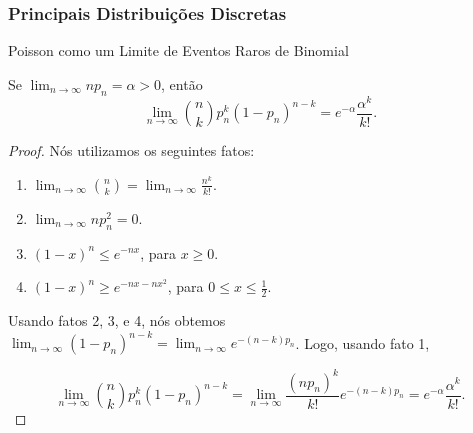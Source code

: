 \begin{frame}
\frametitle{\textbf{Principais Distribuições Discretas}}
\baselineskip=13pt
\begin{block}{Poisson como um Limite de Eventos Raros de Binomial}


%
\begin{teo}
Se $\lim_{n\rightarrow\infty}np_n=\alpha>0$, então
%
$$\lim_{n\rightarrow\infty}\binom{n}{k}p_n^k(1-p_n)^{n-k}=e^{-\alpha}\frac{\alpha^k}{k!}.$$
\end{teo}

\begin{proof} Nós utilizamos os seguintes fatos:

\begin{enumerate}
\item $\lim_{n\rightarrow\infty}\binom{n}{k}=\lim_{n\rightarrow\infty}\frac{n^k}{k!}$.

\item $\lim_{n\rightarrow\infty}np_n^2=0$.

\item $(1-x)^n\leq e^{-nx}$, para $x\geq 0$.

\item $(1-x)^n\geq e^{-nx-nx^2}$, para $0\leq x\leq \frac{1}{2}$.
\end{enumerate}

Usando fatos 2, 3, e 4, nós obtemos
$\lim_{n\rightarrow\infty}(1-p_n)^{n-k}=\lim_{n\rightarrow\infty}e^{-(n-k)p_n}$.
Logo, usando fato 1,

$$\lim_{n\rightarrow\infty}\binom{n}{k}p_n^k(1-p_n)^{n-k}=\lim_{n\rightarrow\infty}\frac{(np_n)^k}{k!}e^{-(n-k)p_n}=e^{-\alpha}\frac{\alpha^k}{k!}.$$

\end{proof}
\end{block}


\end{frame}

